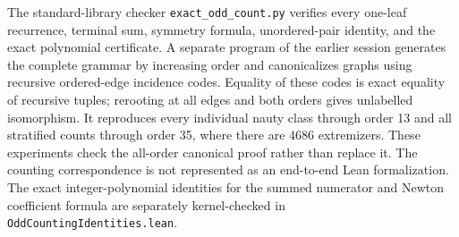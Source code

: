 The standard-library checker \texttt{exact\_odd\_count.py}
verifies every one-leaf recurrence, terminal sum, symmetry
formula, unordered-pair identity, and the exact polynomial
certificate.  A separate program of the earlier session generates the complete
grammar by increasing order and canonicalizes graphs using
recursive ordered-edge incidence codes.  Equality of these
codes is exact equality of recursive tuples; rerooting at
all edges and both orders gives unlabelled isomorphism.
It reproduces every individual nauty class through order 13
and all stratified counts through order 35, where there are
$4686$ extremizers.  These experiments check the all-order
canonical proof rather than replace it.  The counting
correspondence is not represented as an end-to-end Lean
formalization.  The exact integer-polynomial identities for
the summed numerator and Newton coefficient formula are
separately kernel-checked in
\texttt{OddCountingIdentities.lean}.
